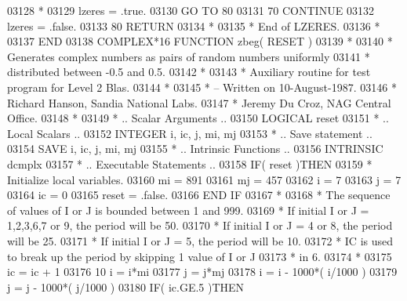 \begin{DoxyCode}
03128 \textcolor{comment}{*}
03129       lzeres = .true.
03130       \textcolor{keywordflow}{GO TO} 80
03131    70 \textcolor{keywordflow}{CONTINUE}
03132       lzeres = .false.
03133    80 \textcolor{keywordflow}{RETURN}
03134 \textcolor{comment}{*}
03135 \textcolor{comment}{*     End of LZERES.}
03136 \textcolor{comment}{*}
03137 \textcolor{keyword}{      END}
03138 \textcolor{keyword}{      COMPLEX*16 }\textcolor{keyword}{FUNCTION }zbeg( RESET )
03139 \textcolor{comment}{*}
03140 \textcolor{comment}{*  Generates complex numbers as pairs of random numbers uniformly}
03141 \textcolor{comment}{*  distributed between -0.5 and 0.5.}
03142 \textcolor{comment}{*}
03143 \textcolor{comment}{*  Auxiliary routine for test program for Level 2 Blas.}
03144 \textcolor{comment}{*}
03145 \textcolor{comment}{*  -- Written on 10-August-1987.}
03146 \textcolor{comment}{*     Richard Hanson, Sandia National Labs.}
03147 \textcolor{comment}{*     Jeremy Du Croz, NAG Central Office.}
03148 \textcolor{comment}{*}
03149 \textcolor{comment}{*     .. Scalar Arguments ..}
03150       \textcolor{keywordtype}{LOGICAL}            reset
03151 \textcolor{comment}{*     .. Local Scalars ..}
03152       \textcolor{keywordtype}{INTEGER}            i, ic, j, mi, mj
03153 \textcolor{comment}{*     .. Save statement ..}
03154       \textcolor{keywordtype}{SAVE}               i, ic, j, mi, mj
03155 \textcolor{comment}{*     .. Intrinsic Functions ..}
03156       \textcolor{keywordtype}{INTRINSIC}          dcmplx
03157 \textcolor{comment}{*     .. Executable Statements ..}
03158       \textcolor{keywordflow}{IF}( reset )\textcolor{keywordflow}{THEN}
03159 \textcolor{comment}{*        Initialize local variables.}
03160          mi = 891
03161          mj = 457
03162          i = 7
03163          j = 7
03164          ic = 0
03165          reset = .false.
03166 \textcolor{keywordflow}{      END IF}
03167 \textcolor{comment}{*}
03168 \textcolor{comment}{*     The sequence of values of I or J is bounded between 1 and 999.}
03169 \textcolor{comment}{*     If initial I or J = 1,2,3,6,7 or 9, the period will be 50.}
03170 \textcolor{comment}{*     If initial I or J = 4 or 8, the period will be 25.}
03171 \textcolor{comment}{*     If initial I or J = 5, the period will be 10.}
03172 \textcolor{comment}{*     IC is used to break up the period by skipping 1 value of I or J}
03173 \textcolor{comment}{*     in 6.}
03174 \textcolor{comment}{*}
03175       ic = ic + 1
03176    10 i = i*mi
03177       j = j*mj
03178       i = i - 1000*( i/1000 )
03179       j = j - 1000*( j/1000 )
03180       \textcolor{keywordflow}{IF}( ic.GE.5 )\textcolor{keywordflow}{THEN}

\end{DoxyCode}
